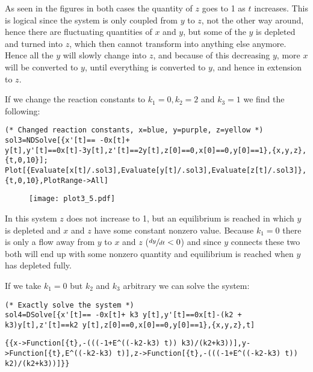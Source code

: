 \documentclass[11pt,a4paper,onecolumn]{article}
\begin{document}
\begin{figure}[H]
  \centering
\end{figure}

As seen in the figures in both cases the quantity of $z$ goes to 1 as $t$ increases. This is logical since the system is only coupled from $y$ to $z$, not the other way around, hence there are fluctuating quantities of $x$ and $y$, but some of the $y$ is depleted and turned into $z$, which then cannot transform into anything else anymore. Hence all the $y$ will slowly change into $z$, and because of this decreasing $y$, more $x$ will be converted to $y$, until everything is converted to $y$, and hence in extension to $z$.

If we change the reaction constants to $k_1 = 0, k_2 = 2$ and $k_3 = 1$ we find the following:

\begin{lstlisting}[mathescape]
(* Changed reaction constants, x=blue, y=purple, z=yellow *)
sol3=NDSolve[{x'[t]== -0x[t]+ y[t],y'[t]==0x[t]-3y[t],z'[t]==2y[t],z[0]==0,x[0]==0,y[0]==1},{x,y,z},{t,0,10}];
Plot[{Evaluate[x[t]/.sol3],Evaluate[y[t]/.sol3],Evaluate[z[t]/.sol3]},{t,0,10},PlotRange->All]
\end{lstlisting}

\begin{figure}[H]
  \centering
  \texttt{[image: plot3\_5.pdf]}
\end{figure}

In this system $z$ does not increase to 1, but an equilibrium is reached in which $y$ is depleted and $x$ and $z$ have some constant nonzero value. Because $k_1 = 0$ there is only a flow away from $y$ to $x$ and $z$ ($\sfrac{dy}{dt} < 0$) and since $y$ connects these two both will end up with some nonzero quantity and equilibrium is reached when $y$ has depleted fully.

If we take $k_1 = 0$ but $k_2$ and $k_3$ arbitrary we can solve the system:

\begin{lstlisting}[mathescape]
(* Exactly solve the system *)
sol4=DSolve[{x'[t]== -0x[t]+ k3 y[t],y'[t]==0x[t]-(k2 + k3)y[t],z'[t]==k2 y[t],z[0]==0,x[0]==0,y[0]==1},{x,y,z},t]
\end{lstlisting}

\begin{lstlisting}[mathescape]
{{x->Function[{t},-(((-1+E^((-k2-k3) t)) k3)/(k2+k3))],y->Function[{t},E^((-k2-k3) t)],z->Function[{t},-(((-1+E^((-k2-k3) t)) k2)/(k2+k3))]}}
\end{lstlisting}
\end{document}
